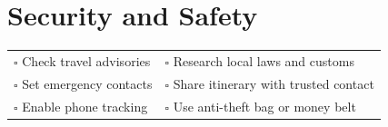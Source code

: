 
\section{Security and Safety}
\label{sec:security}

\begin{tabular}{p{9cm} p{8cm}}
$\square$ Check travel advisories & $\square$ Research local laws and customs \\ 
$\square$ Set emergency contacts & $\square$ Share itinerary with trusted contact \\ 
$\square$ Enable phone tracking & $\square$ Use anti-theft bag or money belt \\ 
\end{tabular}


